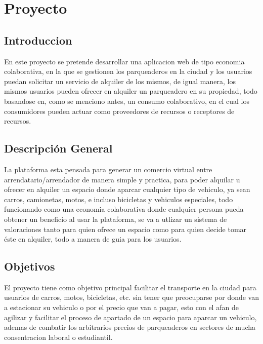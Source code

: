 \chapter{Proyecto}

\section{Introduccion}
En este proyecto se pretende desarrollar una aplicacion web de tipo economia colaborativa, en la que se gestionen los parqueaderos en la ciudad y los usuarios puedan solicitar un servicio de alquiler de los mismos, de igual manera, los mismos usuarios pueden ofrecer en alquiler un parqueadero en su propiedad, todo basandose en, como se menciono antes, un consumo colaborativo, en el cual los consumidores pueden actuar como proveedores de recursos o receptores de recursos.



\newpage
\section{Descripción General}
La plataforma esta pensada para generar un comercio virtual entre arrendatario/arrendador de manera simple y practica, para poder alquilar u ofrecer en alquiler un espacio donde aparcar cualquier tipo de vehiculo, ya sean carros, camionetas, motos, e incluso bicicletas y vehiculos especiales, todo funcionando como una economia colaborativa donde cualquier persona pueda obtener un beneficio al usar la plataforma, se va a utlizar un sistema de valoraciones tanto para quien ofrece un espacio como para quien decide tomar éste en alquiler, todo a manera de guia para los usuarios.

\newpage
\section{Objetivos}
El proyecto tiene como objetivo principal facilitar el transporte en la ciudad para usuarios de carros, motos, bicicletas, etc. sin tener que preocuparse por donde van a estacionar su vehiculo o por el precio que van a pagar, esto con el afan de agilizar y facilitar el proceso de apartado de un espacio para aparcar un vehiculo, ademas de combatir los arbitrarios precios de parqueaderos en sectores de mucha consentracion laboral o estudiantil.

\newpage

